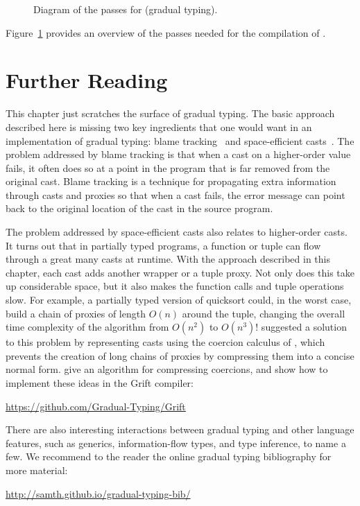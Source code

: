 \documentclass[7x10]{TimesAPriori_MIT}%
\numberwithin{theorem}{chapter}
\numberwithin{definition}{chapter}
\numberwithin{equation}{chapter}
\begin{document}
\begin{figure}[t]
\caption{Diagram of the passes for \LangGrad{} (gradual typing).}
\label{fig:Lgradual-passes}
\end{figure}

Figure~\ref{fig:Lgradual-passes} provides an overview of the passes
needed for the compilation of \LangGrad{}.

\section{Further Reading}

This chapter just scratches the surface of gradual typing.  The basic
approach described here is missing two key ingredients that one would
want in an implementation of gradual typing: blame
tracking~\citep{Tobin-Hochstadt:2006fk,Wadler:2009qv} and
space-efficient casts~\citep{Herman:2006uq,Herman:2010aa}.  The
problem addressed by blame tracking is that when a cast on a
higher-order value fails, it often does so at a point in the program
that is far removed from the original cast. Blame tracking is a
technique for propagating extra information through casts and proxies
so that when a cast fails, the error message can point back to the
original location of the cast in the source program.

The problem addressed by space-efficient casts also relates to
higher-order casts. It turns out that in partially typed programs, a
function or tuple can flow through a great many casts at runtime. With
the approach described in this chapter, each cast adds another
 wrapper or a tuple proxy. Not only does this take up
considerable space, but it also makes the function calls and tuple
operations slow.  For example, a partially typed version of quicksort
could, in the worst case, build a chain of proxies of length $O(n)$
around the tuple, changing the overall time complexity of the
algorithm from $O(n^2)$ to $O(n^3)$! \citet{Herman:2006uq} suggested a
solution to this problem by representing casts using the coercion
calculus of \citet{Henglein:1994nz}, which prevents the creation of
long chains of proxies by compressing them into a concise normal
form. \citet{Siek:2015ab} give an algorithm for compressing coercions,
and \citet{Kuhlenschmidt:2019aa} show how to implement these ideas in
the Grift compiler:
\begin{center}
  \url{https://github.com/Gradual-Typing/Grift}
\end{center}

There are also interesting interactions between gradual typing and
other language features, such as generics, information-flow types, and
type inference, to name a few. We recommend to the reader the
online gradual typing bibliography for more material:
\begin{center}
  \url{http://samth.github.io/gradual-typing-bib/}
\end{center}
\end{document}
